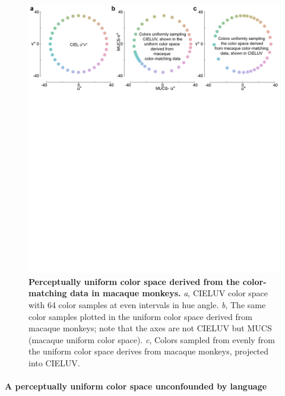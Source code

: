 \begin{figure}
    \begin{fullwidth}
    \centering
      \includegraphics[width=\textwidth+4cm,trim={0 15cm 0 0},clip]{../Figures/flat/F6_ColSpace_2}
           \caption{\textbf{Perceptually uniform color space derived from the color-matching data in macaque monkeys.} 
			\emph{a}, CIELUV color space with 64 color samples at even intervals in hue angle. 
			\emph{b}, The same color samples plotted in the uniform color space derived from macaque monkeys; note that the axes are not CIELUV but MUCS (macaque uniform color space). 
			\emph{c}, Colors sampled from evenly from the uniform color space derives from macaque monkeys, projected into CIELUV.}
		\label{fig:MACBEHcolorspace}
    \end{fullwidth}
\end{figure}


\paragraph{A perceptually uniform color space unconfounded by language}


